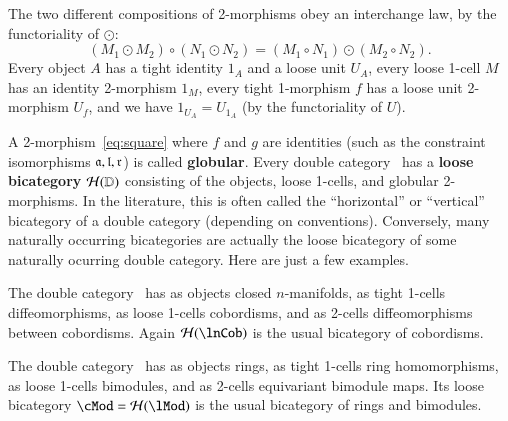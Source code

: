The two different compositions of 2-morphisms obey an interchange law,
by the functoriality of $\odot$:
\[(M_1\odot M_2) \circ (N_1\odot N_2) = (M_1\circ N_1)\odot (M_2\circ N_2).
\]
Every object $A$ has a tight identity $1_A$ and a loose unit
$U_A$, every loose 1-cell $M$ has an identity 2-morphism $1_M$, every
tight 1-morphism $f$ has a loose unit 2-morphism $U_f$, and we
have $1_{U_A} = U_{1_A}$ (by the functoriality of $U$).



A 2-morphism~\eqref{eq:square} where $f$ and $g$ are identities (such
as the constraint isomorphisms $\mathfrak{a},\mathfrak{l},\mathfrak{r}$) is called
\textbf{globular}.  Every double category \lD\ has a
\textbf{loose bicategory} $\mathcal{H}(\mathbb{D})$ consisting of the objects,
loose 1-cells, and globular 2-morphisms.  In the literature, this is often called the ``horizontal'' or ``vertical'' bicategory of a double category (depending on conventions). Conversely, many naturally
occurring bicategories are actually the loose bicategory of some
naturally ocurring double category.  Here are just a few examples.

\begin{eg}
  The double category \lnCob\ has as objects closed $n$-manifolds, as
  tight 1-cells diffeomorphisms, as loose 1-cells cobordisms, and as
  2-cells diffeomorphisms between cobordisms.  Again $\cH(\lnCob)$
  is the usual bicategory of cobordisms.
\end{eg}

\begin{eg}
  The double category \lMod\ has as objects rings, as tight 1-cells ring
  homomorphisms, as loose 1-cells bimodules, and as 2-cells equivariant
  bimodule maps.  Its loose bicategory $\cMod = \cH(\lMod)$ is
  the usual bicategory of rings and bimodules. 
\end{eg}


